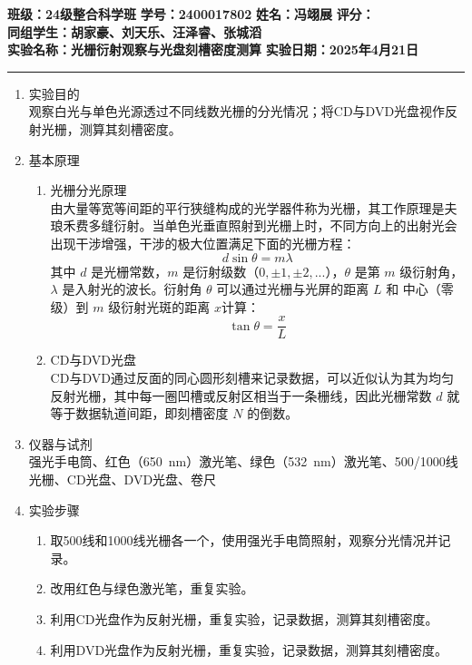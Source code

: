 \documentclass[a4paper]{article}
\begin{document}
\noindent\textbf{班级：24级整合科学班} \hspace{1cm} \textbf{学号：2400017802} \hspace{1cm} \textbf{姓名：冯翊展} \hspace{1cm} \textbf{评分：}\\
\textbf{同组学生：胡家豪、刘天乐、汪泽睿、张城滔} \\
\textbf{实验名称：光栅衍射观察与光盘刻槽密度测算}   \hfill \textbf{实验日期：2025年4月21日} 

\hrule
\vspace{3mm}

\begin{enumerate}[label=\chinese*.,left=0pt]
    \item 实验目的
    \\
    观察白光与单色光源透过不同线数光栅的分光情况；将CD与DVD光盘视作反射光栅，测算其刻槽密度。
   
    \item 基本原理
    \begin{enumerate}[label=\arabic*.,left=0pt]
        \item 光栅分光原理
        \\
        由大量等宽等间距的平行狭缝构成的光学器件称为光栅，其工作原理是夫琅禾费多缝衍射。当单色光垂直照射到光栅上时，不同方向上的出射光会出现干涉增强，干涉的极大位置满足下面的光栅方程：
        $$d \sin \theta = m \lambda$$
        其中 $d$ 是光栅常数，$m$ 是衍射级数（$0,\pm1,\pm2,...$），$\theta$ 是第 $m$ 级衍射角，$\lambda$ 是入射光的波长。衍射角 $\theta$ 可以通过光栅与光屏的距离 $L$ 和 中心（零级）到 $m$ 级衍射光斑的距离 $x$计算：
        $$\tan \theta = \frac{x}{L}$$

        \item CD与DVD光盘
        \\
        CD与DVD通过反面的同心圆形刻槽来记录数据，可以近似认为其为均匀反射光栅，其中每一圈凹槽或反射区相当于一条栅线，因此光栅常数 $d$ 就等于数据轨道间距，即刻槽密度 $N$ 的倒数。
    \end{enumerate}
   
    
        

    
    \item 仪器与试剂
    \\
    强光手电筒、红色（\qty{650}{\nm}）激光笔、绿色（\qty{532}{\nm}）激光笔、500/1000线光栅、CD光盘、DVD光盘、卷尺

    \item 实验步骤
    \begin{enumerate}[label=\arabic*.,left=0pt]
        \item 取500线和1000线光栅各一个，使用强光手电筒照射，观察分光情况并记录。
        \item 改用红色与绿色激光笔，重复实验。
        \item 利用CD光盘作为反射光栅，重复实验，记录数据，测算其刻槽密度。
        \item 利用DVD光盘作为反射光栅，重复实验，记录数据，测算其刻槽密度。
    \end{enumerate}
    

\end{enumerate}
\end{document}
